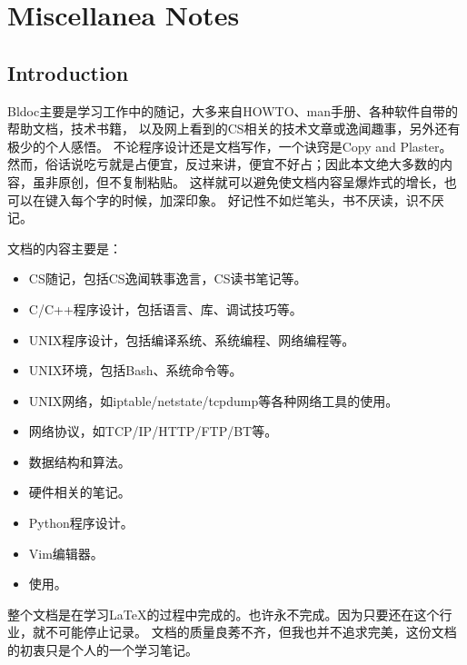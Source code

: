 \part{Miscellanea Notes}

\chapter{Introduction}
Bldoc主要是学习工作中的随记，大多来自HOWTO、man手册、各种软件自带的帮助文档，技术书籍，
以及网上看到的CS相关的技术文章或逸闻趣事，另外还有极少的个人感悟。
不论程序设计还是文档写作，一个诀窍是Copy and Plaster。
然而，俗话说吃亏就是占便宜，反过来讲，便宜不好占；因此本文绝大多数的内容，虽非原创，但不复制粘贴。
这样就可以避免使文档内容呈爆炸式的增长，也可以在键入每个字的时候，加深印象。
好记性不如烂笔头，书不厌读，识不厌记。

文档的内容主要是：
\begin{itemize}
\item CS随记，包括CS逸闻轶事逸言，CS读书笔记等。
\item C/C++程序设计，包括语言、库、调试技巧等。
\item UNIX程序设计，包括编译系统、系统编程、网络编程等。
\item UNIX环境，包括Bash、系统命令等。
\item UNIX网络，如iptable/netstate/tcpdump等各种网络工具的使用。
\item 网络协议，如TCP/IP/HTTP/FTP/BT等。
\item 数据结构和算法。
\item 硬件相关的笔记。
\item Python程序设计。
\item Vim编辑器。
\item 使用。
\end{itemize}

整个文档是在学习\LaTeX{}的过程中完成的。也许永不完成。因为只要还在这个行业，就不可能停止记录。
文档的质量良莠不齐，但我也并不追求完美，这份文档的初衷只是个人的一个学习笔记。



